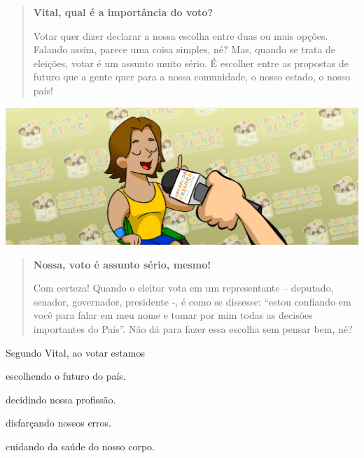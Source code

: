\begin{minipage}{.5\textwidth}
\begin{quote}
\textbf{Vital, qual é a importância do voto?}

Votar quer dizer declarar a nossa escolha entre duas ou mais opções.
Falando assim, parece uma coisa simples, né? Mas, quando se trata de
eleições, votar é um assunto muito sério. É escolher entre as propostas
de futuro que a gente quer para a nossa comunidade, o nosso estado, o
nosso país!
\end{quote}
\end{minipage}\hspace{.5cm}
\begin{minipage}{.5\textwidth}
\includegraphics[width=\textwidth]{./imgs/img51.png}
\end{minipage}

\begin{quote}
\noindent\textbf{Nossa, voto é assunto sério, mesmo!}

Com certeza! Quando o eleitor vota em um representante – deputado,
senador, governador, presidente -, é como se dissesse: “estou confiando
em você para falar em meu nome e tomar por mim todas as decisões
importantes do País”. Não dá para fazer essa escolha sem pensar bem,
né?

\end{quote}

Segundo Vital, ao votar estamos

\begin{minipage}{0.5\textwidth}
\begin{escolha}
\item escolhendo o futuro do país.

\item decidindo nossa profissão.

\item disfarçando nossos erros.

\item cuidando da saúde do nosso corpo.
\end{escolha}
\end{minipage}


